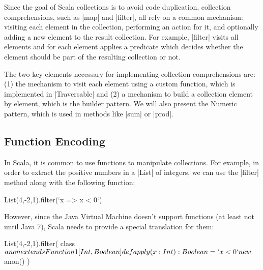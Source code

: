 
Since the goal of Scala collections is to avoid code duplication, collection comprehensions, such as |map| and |filter|, all rely on a common mechanism: visiting each element in the collection, performing an action for it, and optionally adding a new element to the result collection. For example, |filter| visits all elements and for each element applies a predicate which decides whether the element should be part of the resulting collection or not.

The two key elements necessary for implementing collection comprehensions are: (1) the mechanism to visit each element using a custom function, which is implemented in |Traversable| and (2) a mechanism to build a collection element by element, which is the builder pattern. We will also present the Numeric pattern, which is used in methods like |sum| or |prod|.

\subsection{Function Encoding}

In Scala, it is common to use functions to manipulate collections. For example, in order to extract the positive numbers in a |List| of integers, we can use the |filter| method along with the following function:

\begin{lstlisting-nobreak}
 List(4,-2,1).filter(`x => x < 0`)
\end{lstlisting-nobreak}

However, since the Java Virtual Machine doesn't support functions (at least not until Java 7), Scala needs to provide a special translation for them:

\begin{lstlisting-nobreak}
 List(4,-2,1).filter({
     class $anon extends Function1[Int, Boolean] {
       def apply(x: Int): Boolean = `x < 0`
     }
     new $anon()
   })
\end{lstlisting-nobreak}

